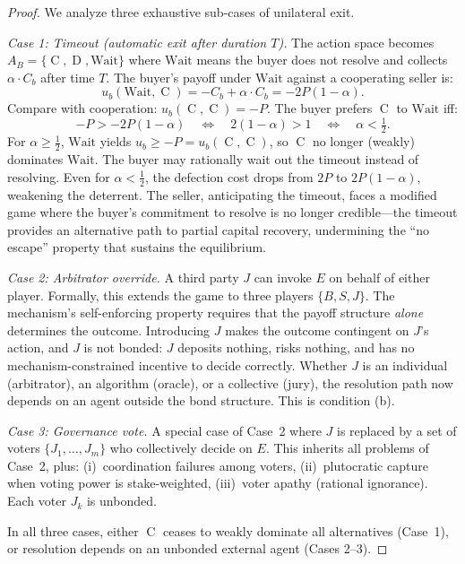 \documentclass[11pt,a4paper]{article}
\theoremstyle{definition}
\theoremstyle{remark}
\newcommand{\pay}{P}           %
\newcommand{\bbond}{C_b}       %
\newcommand{\ub}{u_b}          %
\DeclareMathOperator{\Coop}{C}
\DeclareMathOperator{\Def}{D}
\begin{document}
\begin{proof}
We analyze three exhaustive sub-cases of unilateral exit.

\emph{Case 1: Timeout (automatic exit after duration $T$).}
The action space becomes $A_B = \{\Coop, \Def, \text{Wait}\}$ where
$\text{Wait}$ means the buyer does not resolve and collects
$\alpha \cdot \bbond$ after time $T$. The buyer's payoff under
$\text{Wait}$ against a cooperating seller is:
\begin{equation}
  \ub(\text{Wait}, \Coop) = -\bbond + \alpha \cdot \bbond
    = -2\pay(1 - \alpha).
  \label{eq:timeout-payoff}
\end{equation}
Compare with cooperation: $\ub(\Coop, \Coop) = -\pay$. The buyer
prefers $\Coop$ to $\text{Wait}$ iff:
\begin{equation}
  -\pay > -2\pay(1 - \alpha)
  \quad\Longleftrightarrow\quad
  2(1 - \alpha) > 1
  \quad\Longleftrightarrow\quad
  \alpha < \tfrac{1}{2}.
  \label{eq:timeout-threshold}
\end{equation}
For $\alpha \geq \frac{1}{2}$, $\text{Wait}$ yields
$\ub \geq -\pay = \ub(\Coop, \Coop)$, so $\Coop$ no longer
(weakly) dominates $\text{Wait}$. The buyer may rationally wait out the
timeout instead of resolving. Even for $\alpha < \frac{1}{2}$, the
defection cost drops from $2\pay$ to $2\pay(1 - \alpha)$, weakening
the deterrent. The seller, anticipating the timeout, faces a modified
game where the buyer's commitment to resolve is no longer credible---the
timeout provides an alternative path to partial capital recovery,
undermining the ``no escape'' property that sustains the equilibrium.

\emph{Case 2: Arbitrator override.}
A third party $J$ can invoke $E$ on behalf of either player.
Formally, this extends the game to three players $\{B, S, J\}$.
The mechanism's self-enforcing property requires that the payoff
structure \emph{alone} determines the outcome. Introducing $J$
makes the outcome contingent on $J$'s action, and $J$ is not bonded:
$J$ deposits nothing, risks nothing, and has no mechanism-constrained
incentive to decide correctly. Whether $J$ is an individual
(arbitrator), an algorithm (oracle), or a collective (jury), the
resolution path now depends on an agent outside the bond structure.
This is condition (b).

\emph{Case 3: Governance vote.}
A special case of Case~2 where $J$ is replaced by a set of voters
$\{J_1, \ldots, J_m\}$ who collectively decide on $E$. This inherits
all problems of Case~2, plus: (i)~coordination failures among voters,
(ii)~plutocratic capture when voting power is stake-weighted,
(iii)~voter apathy (rational ignorance). Each voter $J_k$ is unbonded.

In all three cases, either $\Coop$ ceases to weakly dominate all
alternatives (Case~1), or resolution depends on an unbonded external
agent (Cases 2--3). \qedhere
\end{proof}
\end{document}
